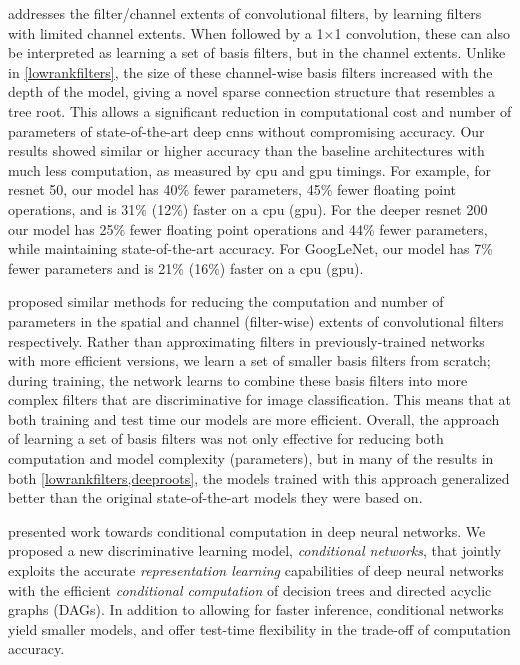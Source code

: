 \documentclass[thesis]{subfiles}
\begin{document}
 addresses the filter/channel extents of convolutional filters, by learning filters with limited channel extents. When followed by a 1$\times$1 convolution, these can also be interpreted as learning a set of basis filters, but in the channel extents. 
Unlike in \cref{lowrankfilters}, the size of these channel-wise basis filters increased with the depth of the model, giving a novel sparse connection structure that resembles a tree root. This allows a significant reduction in computational cost and number of parameters of state-of-the-art deep \glspl{cnn} without compromising accuracy. Our results showed similar or higher accuracy than the baseline architectures with much less computation, as measured by \gls{cpu} and \gls{gpu} timings. For example, for \gls{resnet} 50, our model has 40\% fewer parameters, 45\% fewer floating point operations, and is 31\% (12\%) faster on a \gls{cpu} (\gls{gpu}). For the deeper \gls{resnet} 200 our model has 25\% fewer floating point operations and 44\% fewer parameters, while maintaining state-of-the-art accuracy. For GoogLeNet, our model has 7\% fewer parameters and is 21\% (16\%) faster on a \gls{cpu} (\gls{gpu}).

 proposed similar methods for reducing the computation and number of parameters in the spatial and channel (filter-wise) extents of convolutional filters respectively. Rather than approximating filters in previously-trained networks with more efficient versions, we learn a set of smaller basis filters from scratch; during training, the network learns to combine these basis filters into more complex filters that are discriminative for image classification. This means that at both training and test time our models are more efficient. Overall, the approach of learning a set of basis filters was not only effective for reducing both computation and model complexity (parameters), but in many of the results in both \cref{lowrankfilters,deeproots}, the models trained with this approach generalized better than the original state-of-the-art models they were based on.

 presented work towards conditional computation in deep neural networks. We proposed a new discriminative learning model, \emph{conditional networks}, 
that jointly exploits the accurate \emph{representation learning} capabilities of deep neural networks with the efficient \emph{conditional computation} of decision trees and directed acyclic graphs (DAGs). In addition to allowing for faster inference, conditional networks yield smaller models, and offer test-time flexibility in the trade-off of computation \vs accuracy.
\end{document}
